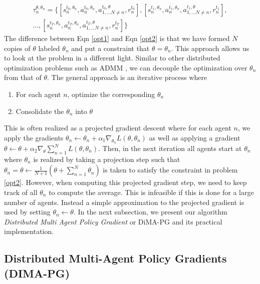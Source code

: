 \documentclass{article}
\begin{document}
\begin{equation}\label{traj2}
\begin{split}
\tau_{n}^{\theta, \theta_n} =\Big\{ [s_{n}^{t_0,\theta_n},a_{n}^{t_0,\theta_n}, a_{1,\ldots N \neq n}^{t_0,\theta}, r_{n}^{t_0}], [s_{n}^{t_1,\theta_n},a_{n}^{t_1,\theta_n}, a_{1,\ldots N \neq n}^{t_1,\theta}, r_{n}^{t_1}],\\
\ldots, [s_{n}^{t_T,\theta_n},a_{n}^{t_T,\theta_n}, a_{1,\ldots N \neq n}^{t_T,\theta}, r_{n}^{t_T} ] \Big\}
\end{split}
\end{equation}
The difference between Eqn \ref{opt1} and Eqn \ref{opt2} is that we have formed $N$ copies of $\theta$ labeled $\theta_n$ and put a constraint that $\theta = \theta_n$. This approach allows us to look at the problem in a different light. Similar to other distributed optimization problems such as ADMM \cite{boyd2011distributed}, we can decouple the optimization over $\theta_n$ from that of $\theta$. The general approach is an iterative process where
\begin{enumerate}
\item For each agent $n$, optimize the corresponding $\theta_n$ 
\item Consolidate the $\theta_n$ into $\theta$
\end{enumerate}
This is often realized as a projected gradient descent where for each agent $n$, we apply the gradients $\theta_n \leftarrow \theta_n + \alpha_1 \nabla_{\theta_n}L(\theta, \theta_n)$ as well as applying a gradient $\theta \leftarrow \theta + \alpha_2  \nabla_\theta \sum_{n=1}^N L(\theta, \theta_n)$. Then, in the next iteration all agents start at $\theta_n$ where $\theta_n$ is realized by taking a projection step such that $\theta_n = \theta \leftarrow  \frac{1}{N+1} (\theta + \sum_{n=1}^N \theta_n)$ is taken to satisfy the constraint in problem \ref{opt2}. However, when computing this projected gradient step, we need to keep track of all $\theta_n$ to compute the average. This is infeasible if this is done for a large number of agents. Instead a simple approximation to the projected gradient is used  by setting $\theta_n \leftarrow \theta$. In the next subsection, we present our algorithm \textit{Distributed Multi Agent Policy Gradient} or DiMA-PG and its practical implementation.

\subsection{Distributed Multi-Agent Policy Gradients (DIMA-PG)}
\end{document}
